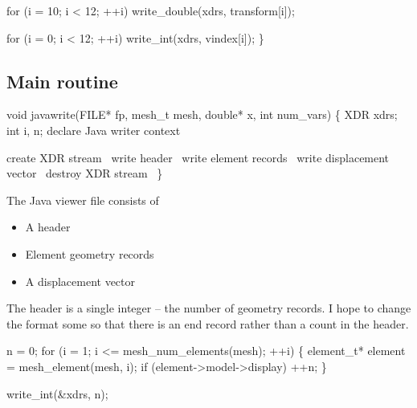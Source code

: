     for (i = 10; i < 12; ++i)
        write_double(xdrs, transform[i]);

    for (i = 0; i < 12; ++i)
        write_int(xdrs, vindex[i]);
\}

\nwendcode{}\nwdocspar


\subsection{Main routine}

\nwenddocs{}\endmoddef
void javawrite(FILE* fp, mesh_t mesh, double* x, int num_vars)
\{
    XDR xdrs;
    int i, n;
    \LA{}declare Java writer context~{\nwtagstyle{}}\RA{}

    \LA{}create XDR stream~{\nwtagstyle{}}\RA{}
    \LA{}write header~{\nwtagstyle{}}\RA{}
    \LA{}write element records~{\nwtagstyle{}}\RA{}
    \LA{}write displacement vector~{\nwtagstyle{}}\RA{}
    \LA{}destroy XDR stream~{\nwtagstyle{}}\RA{}    
\}

\nwendcode{}\nwdocspar

The Java viewer file consists of
\begin{itemize}
  \item A header
  \item Element geometry records
  \item A displacement vector
\end{itemize}

The header is a single integer -- the number of geometry records.
I hope to change the format some so that there is an end record
rather than a count in the header.

\nwenddocs{}\endmoddef
n = 0;
for (i = 1; i <= mesh_num_elements(mesh); ++i) \{
    element_t* element = mesh_element(mesh, i);
    if (element->model->display)
        ++n;
\}

write_int(&xdrs, n);

\nwendcode{}\nwdocspar

